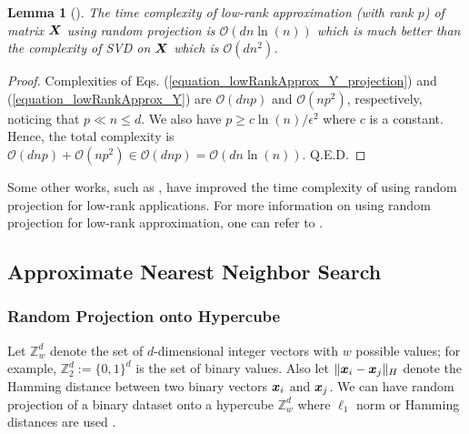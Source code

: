 \documentclass{article}
\newtheorem{lemma}{Lemma}
\def\b{\ensuremath\boldsymbol}
\begin{document}
\begin{lemma}[\cite{papadimitriou2000latent}]
The time complexity of low-rank approximation (with rank $p$) of matrix $\b{X}$ using random projection is $\mathcal{O}(d n \ln(n))$ which is much better than the complexity of SVD on $\b{X}$ which is $\mathcal{O}(d n^2)$. 
\end{lemma}
\begin{proof}
Complexities of Eqs. (\ref{equation_lowRankApprox_Y_projection}) and (\ref{equation_lowRankApprox_Y}) are $\mathcal{O}(d n p)$ and $\mathcal{O}(n p^2)$, respectively, noticing that $p \ll n \leq d$. We also have $p \geq c \ln(n) / \epsilon^2$ where $c$ is a constant. Hence, the total complexity is $\mathcal{O}(d n p) + \mathcal{O}(n p^2) \in \mathcal{O}(d n p) = \mathcal{O}(d n \ln(n))$. Q.E.D.
\end{proof}

Some other works, such as \cite{frieze2004fast,martinsson2007fast}, have improved the time complexity of using random projection for low-rank applications.
For more information on using random projection for low-rank approximation, one can refer to {\citep[Chapter 8]{vempala2005random}}. 

\subsection{Approximate Nearest Neighbor Search}

\subsubsection{Random Projection onto Hypercube}\label{section_random_projection_hypercube}

Let $\mathbb{Z}^d_w$ denote the set of $d$-dimensional integer vectors with $w$ possible values; for example, $\mathbb{Z}^d_2 := \{0,1\}^d$ is the set of binary values. Also let $\|\b{x}_i - \b{x}_j\|_H$ denote the Hamming distance between two binary vectors $\b{x}_i$ and $\b{x}_j$. We can have random projection of a binary dataset onto a hypercube $\mathbb{Z}^d_w$ where $\ell_1$ norm or Hamming distances are used \cite{kushilevitz1998algorithm,kushilevitz2000efficient}. 
\end{document}
